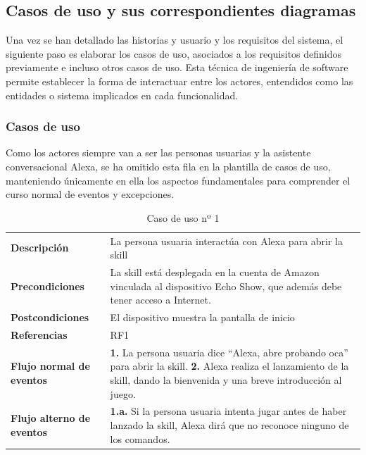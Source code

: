\newpage
\subsection{Casos de uso y sus correspondientes diagramas}

Una vez se han detallado las historias y usuario y los requisitos del sistema, el siguiente paso es elaborar los casos de uso, asociados a los requisitos definidos previamente e incluso otros casos de uso. Esta técnica de ingeniería de software permite establecer la forma de interactuar entre los actores, entendidos como las entidades o sistema implicados en cada funcionalidad.  

\subsubsection{Casos de uso}

Como los actores siempre van a ser las personas usuarias y la asistente conversacional Alexa, se ha omitido esta fila en la plantilla de casos de uso, manteniendo únicamente en ella los aspectos fundamentales para comprender el curso normal de eventos y excepciones.

\begin{table}[H]
	\centering
	\begin{tabular}{|p{3cm}|p{12cm}|}
		\hline
		\rowcolor{lightgray}
		\multicolumn{2}{|c|}{\textbf{CU01}: Iniciar la skill} \\
		\hline
		\textbf{Descripción} & La persona usuaria interactúa con Alexa para abrir la skill \vspace{0.2cm} \\
		\hline
		\textbf{Precondiciones} & La skill está desplegada en la cuenta de Amazon vinculada al dispositivo Echo Show, que además debe tener acceso a Internet. \vspace{0.2cm} \\
		\hline
		\textbf{Postcondiciones} & El dispositivo muestra la pantalla de inicio \vspace{0.2cm} \\
		\hline
		\textbf{Referencias} & RF1 \vspace{0.2cm} \\
		\hline
		\textbf{Flujo normal de eventos} &
		\textbf{1.} La persona usuaria dice \enquote{Alexa, abre probando oca} para abrir la skill. \newline
		\vspace{0.2cm}
		\textbf{2.} Alexa realiza el lanzamiento de la skill, dando la bienvenida y una breve introducción al juego.
		\vspace{0.2cm} \\
		\hline
		\textbf{Flujo alterno de eventos} &
		\textbf{1.a.} Si la persona usuaria intenta jugar antes de haber lanzado la skill, Alexa dirá que no reconoce ninguno de los comandos. \vspace{0.2cm} \\
		\hline
	\end{tabular}
	\caption{Caso de uso nº 1}
	\label{tab:CU01}
\end{table}

